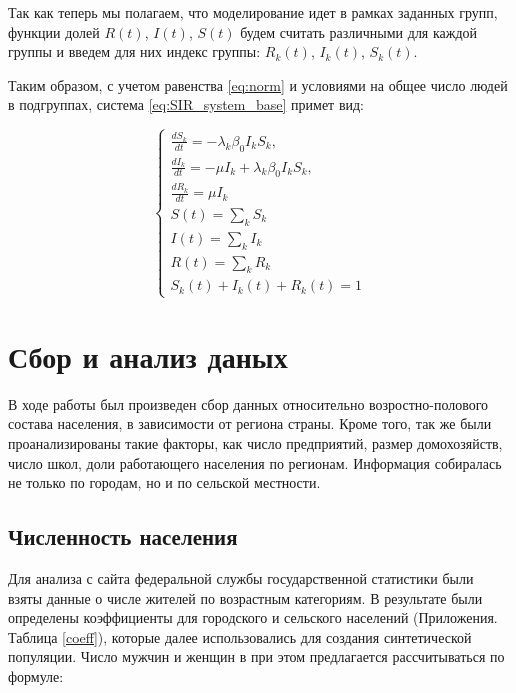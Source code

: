 \documentclass[14pt,a4paper]{article}
\begin{document}
Так как теперь мы полагаем, что моделирование идет в рамках заданных групп, функции долей $R(t)$, $I(t)$, $S(t)$ будем считать различными для каждой группы и введем для них индекс группы: $R_k(t)$, $I_k(t)$, $S_k(t)$.

Таким образом, с учетом равенства \ref{eq:norm} и условиями на общее число людей в подгруппах, система \eqref{eq:SIR_system_base} примет вид:

\begin{equation}
	\begin{cases}
		\frac{d S_k}{d t} = -\lambda_k \beta_0 I_k S_k, \\
		\frac{d I_k}{d t} = -\mu I_k + \lambda_k \beta_0 I_k S_k, \\
		\frac{d R_k}{d t} = \mu I_k \\
		S(t)=\sum_{k} S_{k} \\
		I(t)=\sum_{k} I_{k} \\
		R(t)=\sum_{k} R_{k} \\
		S_k(t) + I_k(t) + R_k(t) = 1
	\end{cases}
	\label{eq:SIR_system_base_groups}
\end{equation}



\section{Сбор и анализ даных}

В ходе работы был произведен сбор данных относительно возростно-полового состава населения, в зависимости от региона страны. Кроме того, так же были проанализированы такие факторы, как число предприятий, размер домохозяйств, число школ, доли работающего населения по регионам. Информация собиралась не только по городам, но и по сельской местности.

\subsection{Численность населения}\label{1}

Для анализа с сайта федеральной службы государственной статистики \cite{rosstat} были взяты данные о числе жителей по возрастным категориям. В результате были определены коэффициенты для городского и сельского населений (Приложения. Таблица \ref{coeff}), которые далее использовались для создания синтетической популяции. Число мужчин и женщин в при этом предлагается рассчитываться по формуле:
\end{document}
